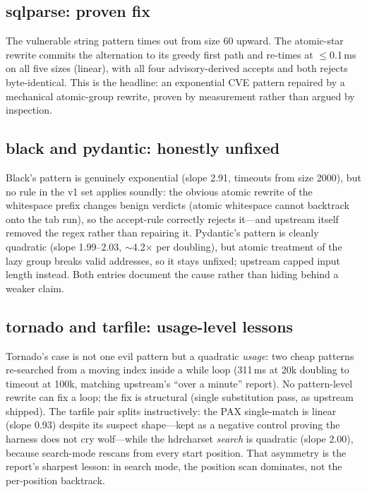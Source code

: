 \documentclass[11pt,a4paper]{article}
\begin{document}
\subsection{sqlparse: proven fix}

The vulnerable string pattern times out from size 60 upward. The atomic-star rewrite commits the alternation to its greedy first path and re-times at $\le$0.1\,ms on all five sizes (linear), with all four advisory-derived accepts and both rejects byte-identical. This is the headline: an exponential CVE pattern repaired by a mechanical atomic-group rewrite, proven by measurement rather than argued by inspection.

\subsection{black and pydantic: honestly unfixed}

Black's pattern is genuinely exponential (slope 2.91, timeouts from size 2000), but no rule in the v1 set applies soundly: the obvious atomic rewrite of the whitespace prefix changes benign verdicts (atomic whitespace cannot backtrack onto the tab run), so the accept-rule correctly rejects it---and upstream itself removed the regex rather than repairing it. Pydantic's pattern is cleanly quadratic (slope 1.99--2.03, $\sim$4.2$\times$ per doubling), but atomic treatment of the lazy group breaks valid addresses, so it stays unfixed; upstream capped input length instead. Both entries document the cause rather than hiding behind a weaker claim.

\subsection{tornado and tarfile: usage-level lessons}

Tornado's case is not one evil pattern but a quadratic \textit{usage}: two cheap patterns re-searched from a moving index inside a while loop (311\,ms at 20k doubling to timeout at 100k, matching upstream's ``over a minute'' report). No pattern-level rewrite can fix a loop; the fix is structural (single substitution pass, as upstream shipped). The tarfile pair splits instructively: the PAX single-match is linear (slope 0.93) despite its suspect shape---kept as a negative control proving the harness does not cry wolf---while the hdrcharset \textit{search} is quadratic (slope 2.00), because search-mode rescans from every start position. That asymmetry is the report's sharpest lesson: in search mode, the position scan dominates, not the per-position backtrack.
\end{document}
